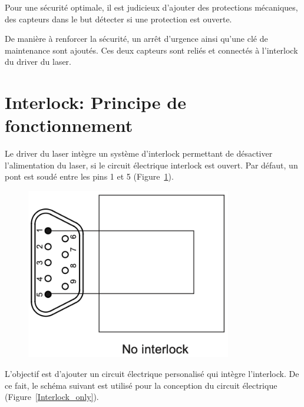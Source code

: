 Pour une sécurité optimale, il est judicieux d'ajouter des protections mécaniques, des capteurs dans le but détecter si une protection est ouverte.

De manière à renforcer la sécurité, un arrêt d'urgence ainsi qu'une clé de maintenance sont ajoutés. Ces deux capteurs sont reliés et connectés à l'interlock du driver du laser.

\section{Interlock: Principe de fonctionnement}

\begin{minipage}[c]{0.6\textwidth}
    Le driver du laser intègre un système d'interlock permettant de désactiver l'alimentation du laser, si le circuit électrique interlock est ouvert. Par défaut, un pont est soudé entre les pins 1 et 5 (Figure~\ref{No_interlock}).
\end{minipage}\hfill
\begin{minipage}[c]{0.35\textwidth}
    \begin{figure}[H]
        \begin{center}
            \includegraphics[width=0.8\textwidth]{assets/figures/Protections_laser/Securite_electrique/no_interlock.png}
        \end{center}
        \label{No_interlock}
    \end{figure}
\end{minipage}
\begin{minipage}[c]{0.6\textwidth}
    L'objectif est d'ajouter un circuit électrique personalisé qui intègre l'interlock. De ce fait, le schéma suivant est utilisé pour la conception du circuit électrique (Figure~\ref{Interlock_only}).
\end{minipage}\hfill
